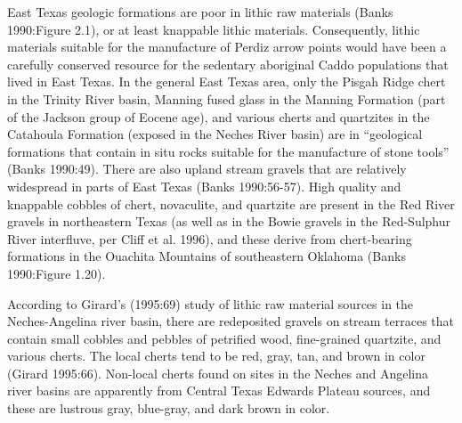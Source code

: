 \documentclass[review]{elsarticle}
\begin{document}
East Texas geologic formations are poor in lithic raw materials (Banks 1990:Figure 2.1), or at least knappable lithic materials. Consequently, lithic materials suitable for the manufacture of Perdiz arrow points would have been a carefully conserved resource for the sedentary aboriginal Caddo populations that lived in East Texas. In the general East Texas area, only the Pisgah Ridge chert in the Trinity River basin, Manning fused glass in the Manning Formation (part of the Jackson group of Eocene age), and various cherts and quartzites in the Catahoula Formation (exposed in the Neches River basin) are in “geological formations that contain in situ rocks suitable for the manufacture of stone tools” (Banks 1990:49). There are also upland stream gravels that are relatively widespread in parts of East Texas (Banks 1990:56-57). High quality and knappable cobbles of chert, novaculite, and quartzite are present in the Red River gravels in northeastern Texas (as well as in the Bowie gravels in the Red-Sulphur River interfluve, per Cliff et al. 1996), and these derive from chert-bearing formations in the Ouachita Mountains of southeastern Oklahoma (Banks 1990:Figure 1.20).

According to Girard’s (1995:69) study of lithic raw material sources in the Neches-Angelina river basin, there are redeposited gravels on stream terraces that contain small cobbles and pebbles of petrified wood, fine-grained quartzite, and various cherts. The local cherts tend to be red, gray, tan, and brown in color (Girard 1995:66). Non-local cherts found on sites in the Neches and Angelina river basins are apparently from Central Texas Edwards Plateau sources, and these are lustrous gray, blue-gray, and dark brown in color.
\end{document}
